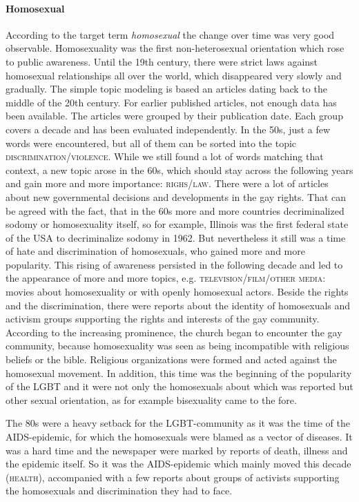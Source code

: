 \documentclass[10pt,a4paper,twocolumn]{scrartcl}
\begin{document}
\paragraph*{Homosexual} According to the target term \textit{homosexual} the change over time was very good observable. Homosexuality was the first non-heterosexual orientation which rose to public awareness. Until the 19th century, there were strict laws against homosexual relationships all over the world, which disappeared very slowly and gradually. The simple topic modeling is based an articles dating back to the middle of the 20th century. For earlier published articles, not enough data has been available. The articles were grouped by their publication date. Each group covers a decade and has been evaluated independently. In the 50s, just a few words were encountered, but all of them can be sorted into the topic \textsc{discrimination/violence}. While we still found a lot of words matching that context, a new topic arose in the 60s, which should stay across the following years and gain more and more importance: \textsc{righs/law}. There were a lot of articles about new governmental decisions and developments in the gay rights. That can be agreed with the fact, that in the 60s more and more countries decriminalized sodomy or homosexuality itself, so for example, Illinois was the first federal state of the USA to decriminalize sodomy in 1962. But nevertheless it still was a time of hate and discrimination of homosexuals, who gained more and more popularity. This rising of awareness persisted in the following decade and led to the appearance of more and more topics, e.g. \textsc{television/film/other media}: movies about homosexuality or with openly homosexual actors. Beside the rights and the discrimination, there were reports about the identity of homosexuals and activism groups supporting the rights and interests of the gay community. According to the increasing prominence, the church began to encounter the gay community, because homosexuality was seen as being incompatible with religious beliefs or the bible. Religious organizations were formed and acted against the homosexual movement. In addition, this time was the beginning of the popularity of the LGBT and it were not only the homosexuals about which was reported but other sexual orientation, as for example bisexuality came to the fore.

The 80s were a heavy setback for the LGBT-community as it was the time of the AIDS-epidemic, for which the homosexuals were blamed as a vector of diseases. It was a hard time and the newspaper were marked by reports of death, illness and the epidemic itself. So it was the AIDS-epidemic which mainly moved this decade (\textsc{health}), accompanied with a few reports about groups of activists supporting the homosexuals and discrimination they had to face.
\end{document}
